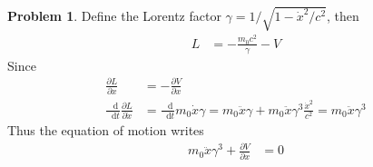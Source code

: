 \documentclass[twoside,11pt]{article}
\newcommand{\lms}{\fontfamily{lmss}\selectfont} %
\renewcommand*\d{\mathop{}\!\mathrm{d}}
\theoremstyle{definition}
\newtheorem{problem}{\lms Problem}
\theoremstyle{remark}
\begin{document}
\begin{problem}
Define the Lorentz factor $\gamma = 1/\sqrt{1-\dot{x}^2/c^2}$, then
\begin{align*}
    L &= -\frac{m_0c^2}{\gamma} - V
\end{align*}
Since
\begin{align*}
    \frac{\partial L}{\partial x} &= -\frac{\partial V}{\partial x}\\
    \frac{\d}{\d t}\frac{\partial L}{\partial \dot{x}} &= 
    \frac{\d}{\d t}m_0\dot{x}\gamma = m_0\ddot{x}\gamma + m_0\ddot{x}\gamma^3\frac{\dot{x}^2}{c^2}
    = m_0\ddot{x}\gamma^3
\end{align*}
Thus the equation of motion writes
\begin{align*}
    m_0\ddot{x}\gamma^3 + \frac{\partial V}{\partial x} &= 0
\end{align*}

\end{problem}
\end{document}
